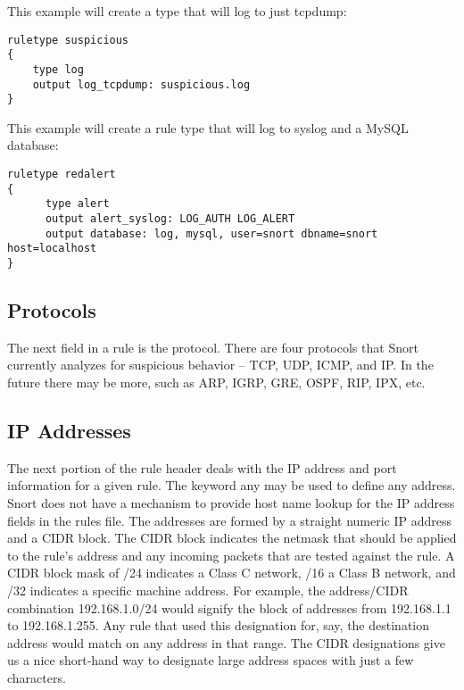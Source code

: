 \documentclass[english]{report}
\begin{document}
This example will create a type that will log to just tcpdump:

\begin{verbatim}
ruletype suspicious
{
    type log 
    output log_tcpdump: suspicious.log
}
\end{verbatim}

This example will create a rule type that will log to syslog and a
MySQL database:

\begin{center}
\begin{verbatim}
ruletype redalert
{
      type alert 
      output alert_syslog: LOG_AUTH LOG_ALERT 
      output database: log, mysql, user=snort dbname=snort host=localhost 
}
\end{verbatim}
\end{center}

\subsection{Protocols}

The next field in a rule is the protocol. There are four protocols
that Snort currently analyzes for suspicious behavior -- TCP, UDP,
ICMP, and IP. In the future there may be more, such as ARP, IGRP,
GRE, OSPF, RIP, IPX, etc.


\subsection{IP Addresses}

The next portion of the rule header deals with the IP address and
port information for a given rule. The keyword any
may be used to define any address. Snort does not have a mechanism
to provide host name lookup for the IP address fields in the rules
file. The addresses are formed by a straight numeric IP address and
a CIDR\cite{cidrnotation} block. The CIDR block indicates the netmask
that should be applied to the rule's address and any incoming packets
that are tested against the rule. A CIDR block mask of /24 indicates
a Class C network, /16 a Class B network, and /32 indicates a specific
machine address. For example, the address/CIDR combination 192.168.1.0/24
would signify the block of addresses from 192.168.1.1 to 192.168.1.255.
Any rule that used this designation for, say, the destination address
would match on any address in that range. The CIDR designations give
us a nice short-hand way to designate large address spaces with just
a few characters.
\end{document}
